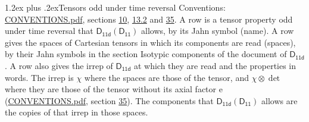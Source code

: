 \documentclass[10pt,a4paper]{article}
\makeatletter
\renewcommand\section{\@startsection{section}{1}{\z@}{-3ex plus -1ex minus -.2ex}%
  {1.2ex plus .2ex}{\normalfont\large\sffamily\bfseries\color{parttitle}}}
\numberwithin{equation}{section}
\newcommand{\grp}[1]{\mathsf{#1}}
\newcommand{\irrprod}{\otimes}
\makeatother
\begin{document}
\section{Tensors odd under time reversal}\label{s:time_odd}
Conventions: \href{../../CONVENTIONS.pdf}{CONVENTIONS.pdf}, sections \href{../../../rotation/CONVENTIONS.pdf\#conv.10}{10}, \href{../../../rotation/CONVENTIONS.pdf\#conv.13.2}{13.2} and \href{../../CONVENTIONS.pdf\#conv.35}{35}.
\leavevmode\label{n:head.name.property}A row is a tensor property odd under time reversal that $\grp{D_{11d}}(\grp{D_{11}})$ allows, by its Jahn symbol (name). \label{n:head.spaces}A row gives the spaces of Cartesian tensors in which its components are read (spaces), by their Jahn symbols in the section Isotypic components of the document of \href{../../../rotation/data/pdf/D11d.pdf}{$\grp{D_{11d}}$}. \label{n:head.properties}A row also gives the irrep of $\grp{D_{11d}}$ at which they are read and the properties in words. The irrep is $\chi$ where the spaces are those of the tensor, and $\chi \irrprod \det$ where they are those of the tensor without its axial factor e (\href{../../CONVENTIONS.pdf}{CONVENTIONS.pdf}, section \href{../../CONVENTIONS.pdf\#conv.35}{35}). The components that $\grp{D_{11d}}(\grp{D_{11}})$ allows are the copies of that irrep in those spaces.
\end{document}
